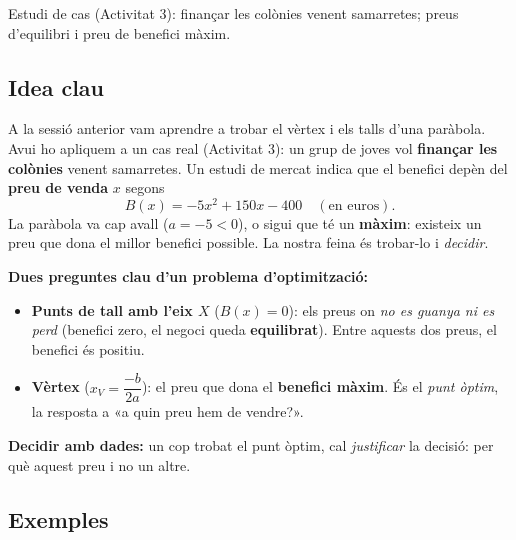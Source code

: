 %
{Estudi de cas (Activitat 3): finançar les colònies venent samarretes; preus d'equilibri i preu de benefici màxim.}

\subsection{Idea clau}

A la sessió anterior vam aprendre a trobar el vèrtex i els talls d'una paràbola.
Avui ho apliquem a un cas real (Activitat 3): un grup de joves vol \textbf{finançar
les colònies} venent samarretes. Un estudi de mercat indica que el benefici depèn
del \textbf{preu de venda} $x$ segons
\[
B(x)=-5x^2+150x-400 \quad(\text{en euros}).
\]
La paràbola va cap avall ($a=-5<0$), o sigui que té un \textbf{màxim}: existeix un
preu que dona el millor benefici possible. La nostra feina és trobar-lo i \emph{decidir}.

\begin{idea}
\textbf{Dues preguntes clau d'un problema d'optimització:}
\begin{itemize}[leftmargin=1.4em, itemsep=2pt]
  \item \textbf{Punts de tall amb l'eix $X$} ($B(x)=0$): els preus on \emph{no es
        guanya ni es perd} (benefici zero, el negoci queda \textbf{equilibrat}).
        Entre aquests dos preus, el benefici és positiu.
  \item \textbf{Vèrtex} ($x_V=\dfrac{-b}{2a}$): el preu que dona el \textbf{benefici
        màxim}. És el \emph{punt òptim}, la resposta a «a quin preu hem de vendre?».
  \end{itemize}
\textbf{Decidir amb dades:} un cop trobat el punt òptim, cal \emph{justificar} la
decisió: per què aquest preu i no un altre.
\end{idea}

\subsection{Exemples}

